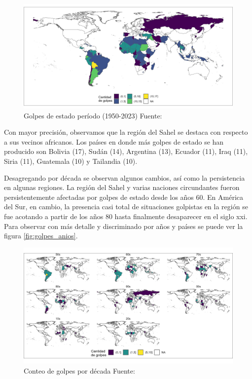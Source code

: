 \documentclass{article}
\begin{document}
\begin{figure}[H]
 \centering 
 \includegraphics[width=1\textwidth]{2_golpes.png}
 \caption{Golpes de estado período (1950-2023) Fuente: \cite{Pow11} \label{fig::mapa_golpes}}
\end{figure}

Con mayor precisión, observamos que la región del Sahel se destaca con respecto a sus
vecinos africanos. Los países en donde más golpes de estado se han producido son
Bolivia (17), Sudán (14), Argentina (13), Ecuador (11), Iraq (11), Siria (11), 
Guatemala (10) y Tailandia (10).

Desagregando por década se observan algunos cambios, así como la persistencia en 
algunas regiones. La región del Sahel y varias naciones circundantes fueron 
persistentemente afectadas por golpes de estado desde los años 60. En América del 
Sur, en cambio, la presencia casi total de situaciones golpistas en la región se 
fue acotando a partir de los años 80 hasta finalmente desaparecer en el siglo 
xxi. Para observar con más detalle y discriminado por años y países se puede ver 
la figura \ref{fig:golpes_anios}.

\begin{figure}[H]
 \centering 
 \includegraphics[width=1\textwidth]{3_golpes_decadas.png}
 \caption{Conteo de golpes por década Fuente:\cite{Pow11} \label{fig:golpes_decadas}}
\end{figure}
\end{document}
